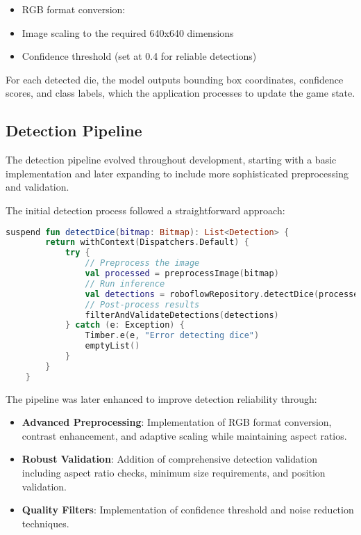 \begin{itemize}
    \item RGB format conversion: 
    \item Image scaling to the required 640x640 dimensions
    \item Confidence threshold (set at 0.4 for reliable detections)
\end{itemize} 

For each detected die, the model outputs bounding box coordinates, confidence scores, and class labels, which the application processes to update the game state.

\subsection{Detection Pipeline}

The detection pipeline evolved throughout development, starting with a basic implementation and later expanding to include more sophisticated preprocessing and validation.

The initial detection process followed a straightforward approach:
\begin{lstlisting}[language=Kotlin, caption={Initial Dice Detection Pipeline}, label=lst:initial_dice_detection]
    suspend fun detectDice(bitmap: Bitmap): List<Detection> {
        return withContext(Dispatchers.Default) {
            try {
                // Preprocess the image
                val processed = preprocessImage(bitmap)
                // Run inference
                val detections = roboflowRepository.detectDice(processed)
                // Post-process results
                filterAndValidateDetections(detections)
            } catch (e: Exception) {
                Timber.e(e, "Error detecting dice")
                emptyList()
            }
        }
    }
\end{lstlisting}

The pipeline was later enhanced to improve detection reliability through:
\begin{itemize}
    \item \textbf{Advanced Preprocessing}: Implementation of RGB format conversion, contrast enhancement, and adaptive scaling while maintaining aspect ratios.
    \item \textbf{Robust Validation}: Addition of comprehensive detection validation including aspect ratio checks, minimum size requirements, and position validation.
    \item \textbf{Quality Filters}: Implementation of confidence threshold and noise reduction techniques.
\end{itemize}

